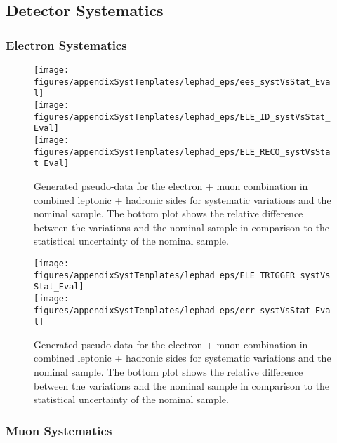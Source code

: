 \clearpage
\subsection{Detector Systematics}
\subsubsection{Electron Systematics}

\begin{figure}[!hb]
\begin{center}
        \texttt{[image: figures/appendixSystTemplates/lephad\_eps/ees\_systVsStat\_Eval]}\\
        \texttt{[image: figures/appendixSystTemplates/lephad\_eps/ELE\_ID\_systVsStat\_Eval]}\\
        \texttt{[image: figures/appendixSystTemplates/lephad\_eps/ELE\_RECO\_systVsStat\_Eval]}
        
\caption{Generated pseudo-data for the electron + muon combination in combined leptonic + hadronic sides for systematic variations and the nominal \ttbar sample. The bottom plot shows the relative difference between the variations and the nominal sample in comparison to the statistical uncertainty of the nominal sample.}   
\label{fig:systematicVar_lephad_ELE_1}
\end{center}
\end{figure}

\begin{figure}[!hb]
\begin{center}
        \texttt{[image: figures/appendixSystTemplates/lephad\_eps/ELE\_TRIGGER\_systVsStat\_Eval]}\\
        \texttt{[image: figures/appendixSystTemplates/lephad\_eps/err\_systVsStat\_Eval]}
\caption{Generated pseudo-data for the electron + muon combination in combined leptonic + hadronic sides for systematic variations and the nominal \ttbar sample. The bottom plot shows the relative difference between the variations and the nominal sample in comparison to the statistical uncertainty of the nominal sample.}   
\label{fig:systematicVar_lephad_ELE_2}
\end{center}
\end{figure}


\clearpage
\subsubsection{Muon Systematics}

